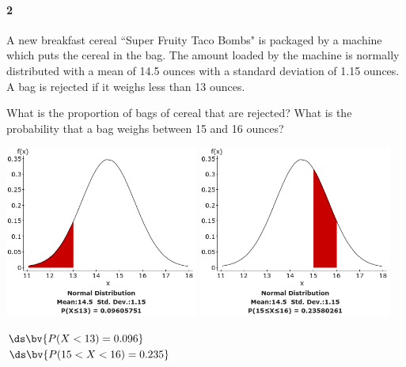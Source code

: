 \documentclass{article}
\begin{document}
\begin{flushleft}
\paragraph{2} A new breakfast cereal ``Super Fruity Taco Bombs" is packaged by a machine which puts the cereal in the bag. The amount loaded by the machine is normally distributed with a mean of 14.5 ounces with a standard deviation of 1.15 ounces. A bag is rejected if it weighs less than 13 ounces.
\begin{enumalpha}
\item What is the proportion of bags of cereal that are rejected? What is the probability that a bag weighs between 15 and 16 ounces?\\
\medskip
{\centering
\includegraphics[width=2.5in]{images/grp06_Q2_a_1} \qquad
\includegraphics[width=2.5in]{images/grp06_Q2_a_2}
\par}
$\ds\bv{P(X < 13) = 0.096}$\\
\medskip
$\ds\bv{P(15 < X < 16) = 0.235}$
\vspace{.5in}


\end{enumalpha}
\end{flushleft}
\end{document}

